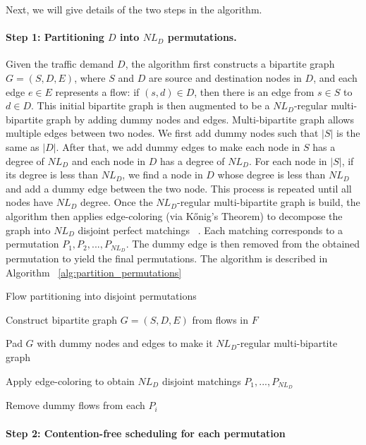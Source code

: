 Next, we
will give details of the two steps in the algorithm.

\paragraph{Step 1: Partitioning $D$ into $NL_D$ permutations.}
Given the traffic demand $D$, the algorithm first constructs a
bipartite graph \( G = (S, D, E) \), where \( S \) and \( D \) are
source and destination nodes in $D$, and each edge \( e \in E \) represents
a flow: if $(s, d) \in D$, then there is an edge from $s\in S$ to $d\in D$. 
This initial bipartite graph is then augmented to be a $NL_D$-regular
multi-bipartite graph by adding dummy nodes and edges. Multi-bipartite graph
allows multiple edges between two nodes. We first add dummy nodes such that
$|S|$ is the same as $|D|$. After that, we add dummy edges to make each node
in $S$ has a degree of $NL_D$ and each node in $D$ has a degree of $NL_D$.
For each node in $|S|$, if its degree is less than $NL_D$, we find a node
in $D$ whose degree is less than $NL_D$ and add a dummy edge between the
two node. This process is repeated until all nodes have $NL_D$ degree. Once
the $NL_D$-regular multi-bipartite graph is build, 
the algorithm then applies edge-coloring (via Kőnig’s Theorem)
to decompose the graph into \( NL_D \) disjoint perfect matchings ~\cite{konig1916graphen}. Each matching corresponds to a permutation
\( P_1, P_2, ..., P_{NL_D} \). The dummy edge is then removed from the
obtained permutation to yield the final permutations.
The algorithm is described in Algorithm ~\ref{alg:partition_permutations}

\begin{algorithm}[H]
\DontPrintSemicolon
\caption{Flow partitioning into disjoint permutations}
\label{alg:partition_permutations}


Construct bipartite graph $G = (S, D, E)$ from flows in $F$\;

Pad $G$ with dummy nodes and edges to make it $NL_D$-regular multi-bipartite
graph\;

Apply edge-coloring to obtain $NL_D$ disjoint matchings $P_1, ..., P_{NL_D}$\;

Remove dummy flows from each $P_i$\;

\end{algorithm}

\paragraph{Step 2: Contention-free scheduling for each permutation}  

